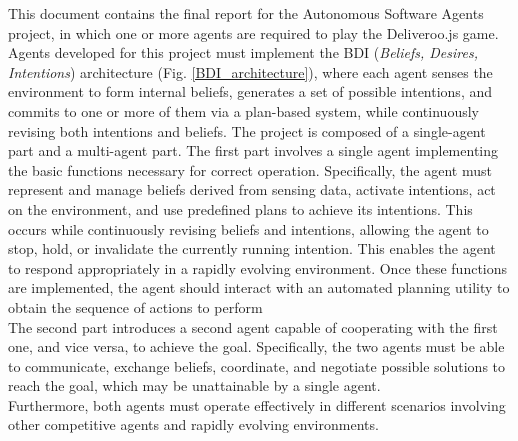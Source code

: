     This document contains the final report for the Autonomous Software Agents project, in which one or more agents are required to play the Deliveroo.js game. Agents developed for this project must implement the BDI (\textit{Beliefs, Desires, Intentions}) architecture (Fig. \ref{BDI_architecture}), where each agent senses the environment to form internal beliefs, generates a set of possible intentions, and commits to one or more of them via a plan-based system, while continuously revising both intentions and beliefs.
    The project is composed of a single-agent part and a multi-agent part. The first part involves a single agent implementing the basic functions necessary for correct operation. Specifically, the agent must represent and manage beliefs derived from sensing data, activate intentions, act on the environment, and use predefined plans to achieve its intentions. This occurs while continuously revising beliefs and intentions, allowing the agent to stop, hold, or invalidate the currently running intention. This enables the agent to respond appropriately in a rapidly evolving environment. Once these functions are implemented, the agent should interact with an automated planning utility to obtain the sequence of actions to perform
    \medskip\\      
    The second part introduces a second agent capable of cooperating with the first one, and vice versa, to achieve the goal. Specifically, the two agents must be able to communicate, exchange beliefs, coordinate, and negotiate possible solutions to reach the goal, which may be unattainable by a single agent.
    \medskip\\
    Furthermore, both agents must operate effectively in different scenarios involving other competitive agents and rapidly evolving environments.
